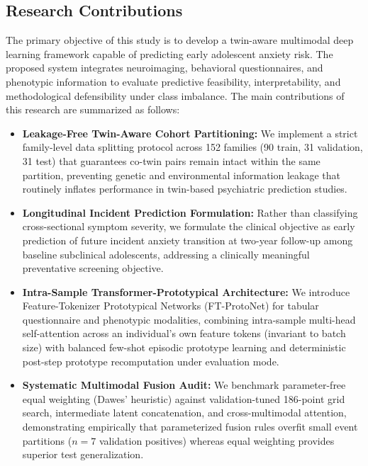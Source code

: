 \documentclass[10pt,letterpaper]{article}
\begin{document}
                \subsection*{Research Contributions}

        The primary objective of this study is to develop a twin-aware
        multimodal deep learning framework capable of predicting early
        adolescent anxiety risk. The proposed system integrates
        neuroimaging, behavioral questionnaires, and phenotypic
        information to evaluate predictive feasibility, interpretability,
        and methodological defensibility under class imbalance. The main contributions of this research
        are summarized as follows:

        \begin{itemize}
        
        \item \textbf{Leakage-Free Twin-Aware Cohort Partitioning:} We implement a strict family-level data splitting protocol across 152 families (90 train, 31 validation, 31 test) that guarantees co-twin pairs remain intact within the same partition, preventing genetic and environmental information leakage that routinely inflates performance in twin-based psychiatric prediction studies.
        
        \item \textbf{Longitudinal Incident Prediction Formulation:} Rather than classifying cross-sectional symptom severity, we formulate the clinical objective as early prediction of future incident anxiety transition at two-year follow-up among baseline subclinical adolescents, addressing a clinically meaningful preventative screening objective.
        
        \item \textbf{Intra-Sample Transformer-Prototypical Architecture:} We introduce Feature-Tokenizer Prototypical Networks (FT-ProtoNet) for tabular questionnaire and phenotypic modalities, combining intra-sample multi-head self-attention across an individual's own feature tokens (invariant to batch size) with balanced few-shot episodic prototype learning and deterministic post-step prototype recomputation under evaluation mode.
        
        \item \textbf{Systematic Multimodal Fusion Audit:} We benchmark parameter-free equal weighting (Dawes' heuristic) against validation-tuned 186-point grid search, intermediate latent concatenation, and cross-multimodal attention, demonstrating empirically that parameterized fusion rules overfit small event partitions ($n=7$ validation positives) whereas equal weighting provides superior test generalization.
        

\end{itemize}
\end{document}
